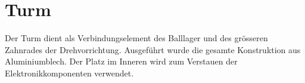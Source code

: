 \section{Turm}
Der Turm dient als Verbindungselement des Balllager und des grösseren 
Zahnrades der Drehvorrichtung. Ausgeführt wurde die gesamte Konstruktion aus 
Aluminiumblech. Der Platz im Inneren wird zum Verstauen der 
Elektronikkomponenten verwendet.
